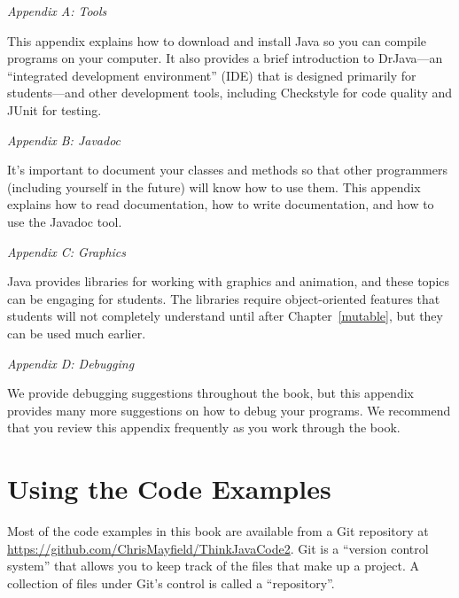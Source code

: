 \begin{description}

\item {\em Appendix A: Tools}

This appendix explains how to download and install Java so you can compile programs on your computer.
It also provides a brief introduction to DrJava---an ``integrated development environment'' (IDE) that is designed primarily for students---and other development tools, including Checkstyle for code quality and JUnit for testing.

\item {\em Appendix B: Javadoc}

It's important to document your classes and methods so that other programmers (including yourself in the future) will know how to use them.
This appendix explains how to read documentation, how to write documentation, and how to use the Javadoc tool.

\item {\em Appendix C: Graphics}

Java provides libraries for working with graphics and animation, and these topics can be engaging for students.
The libraries require object-oriented features that students will not completely understand until after Chapter~\ref{mutable}, but they can be used much earlier.

\item {\em Appendix D: Debugging}

We provide debugging suggestions throughout the book, but this appendix provides many more suggestions on how to debug your programs.
We recommend that you review this appendix frequently as you work through the book.



\end{description}


\section*{Using the Code Examples}
\label{code}

Most of the code examples in this book are available from a Git repository at \url{https://github.com/ChrisMayfield/ThinkJavaCode2}.
Git is a ``version control system'' that allows you to keep track of the files that make up a project.
A collection of files under Git's control is called a ``repository''.

